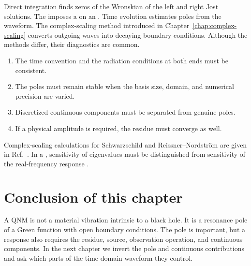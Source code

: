 Direct integration finds zeros of the Wronskian of the left and right Jost solutions. The  imposes a  on an . Time evolution estimates poles from the waveform. The complex-scaling method introduced in Chapter~\ref{chap:complex-scaling} converts outgoing waves into decaying boundary conditions. Although the methods differ, their diagnostics are common.

\begin{enumerate}[label=(\roman*),leftmargin=2.8em]
\item The time convention and the radiation conditions at both ends must be consistent.
\item The poles must remain stable when the basis size, domain, and numerical precision are varied.
\item Discretized continuous components must be separated from genuine poles.
\item If a physical amplitude is required, the residue must converge as well.
\end{enumerate}

Complex-scaling calculations for Schwarzschild and Reissner--Nordstr\"om are given in Ref.~\cite{Ogawa:2026veu}. In a , sensitivity of eigenvalues must be distinguished from sensitivity of the real-frequency response \cite{Jaramillo:2020tuu}.

\section{Conclusion of this chapter}

A QNM is not a material vibration intrinsic to a black hole. It is a resonance pole of a Green function with open boundary conditions. The pole is important, but a response also requires the residue, source, observation operation, and continuous components. In the next chapter we invert the pole and continuous contributions and ask which parts of the time-domain waveform they control.

